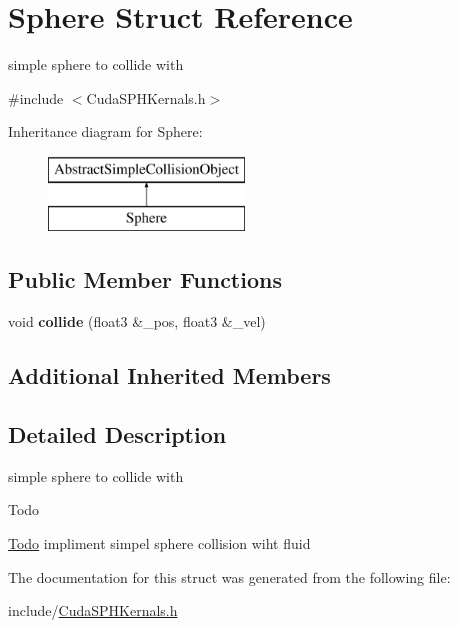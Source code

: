 \hypertarget{struct_sphere}{\section{Sphere Struct Reference}
\label{struct_sphere}
}


simple sphere to collide with  




{\ttfamily \#include $<$Cuda\-S\-P\-H\-Kernals.\-h$>$}

Inheritance diagram for Sphere\-:\begin{figure}[H]
\begin{center}
\leavevmode
\includegraphics[height=2.000000cm]{struct_sphere}
\end{center}
\end{figure}
\subsection*{Public Member Functions}
\begin{DoxyCompactItemize}
\item 
\hypertarget{struct_sphere_ac67caed23139df1d0087099a534d649b}{void {\bfseries collide} (float3 \&\-\_\-pos, float3 \&\-\_\-vel)}\label{struct_sphere_ac67caed23139df1d0087099a534d649b}

\end{DoxyCompactItemize}
\subsection*{Additional Inherited Members}


\subsection{Detailed Description}
simple sphere to collide with 

\begin{DoxyRefDesc}{Todo}
\item[\hyperlink{todo__todo000002}{Todo}]impliment simpel sphere collision wiht fluid \end{DoxyRefDesc}


The documentation for this struct was generated from the following file\-:\begin{DoxyCompactItemize}
\item 
include/\hyperlink{_cuda_s_p_h_kernals_8h}{Cuda\-S\-P\-H\-Kernals.\-h}\end{DoxyCompactItemize}
